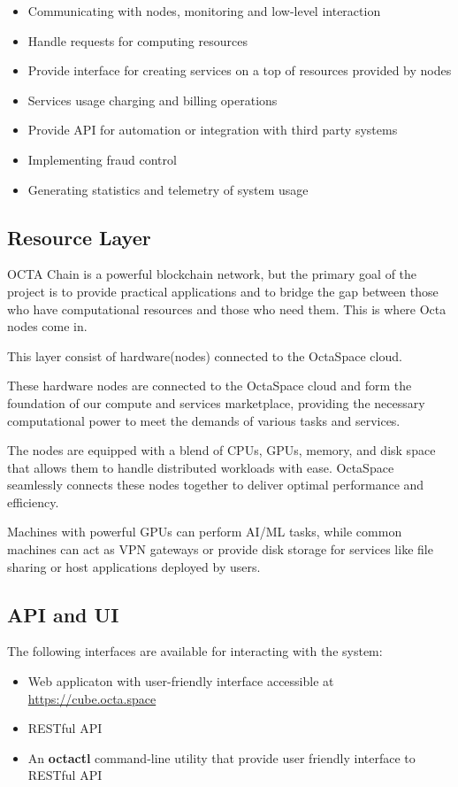 \begin{itemize}
    \item Communicating with nodes, monitoring and low-level interaction
    \item Handle requests for computing resources
    \item Provide interface for creating services on a top of resources provided by nodes
    \item Services usage charging and billing operations
    \item Provide API for automation or integration with third party systems
    \item Implementing fraud control
    \item Generating statistics and telemetry of system usage
\end{itemize}

\subsection{Resource Layer}
OCTA Chain is a powerful blockchain network, but the primary goal of the project is to provide practical applications and to bridge the gap between those who have computational resources and those who need them. This is where Octa nodes come in.

This layer consist of hardware(nodes) connected to the OctaSpace cloud.

These hardware nodes are connected to the OctaSpace cloud and form the foundation of our compute and services marketplace,
providing the necessary computational power to meet the demands of various tasks and services.

The nodes are equipped with a blend of CPUs, GPUs, memory, and disk space that allows them to handle distributed workloads with ease.
OctaSpace seamlessly connects these nodes together to deliver optimal performance and efficiency.

Machines with powerful GPUs can perform AI/ML tasks, while common machines can act as VPN gateways or provide disk storage for services like file sharing or host applications deployed by users.

\subsection{API and UI}

The following interfaces are available for interacting with the system:

\begin{itemize}
    \item Web applicaton with user-friendly interface accessible at \url{https://cube.octa.space}
    \item RESTful API
    \item An \textbf{octactl} command-line utility that provide user friendly interface to RESTful API
\end{itemize}

